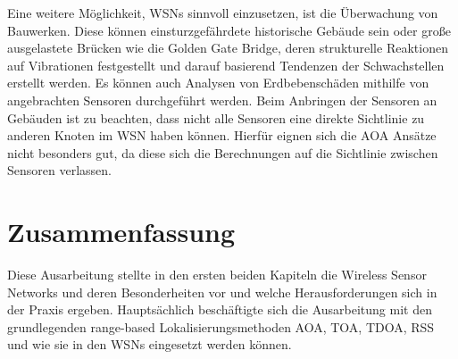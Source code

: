 \documentclass[12pt, a4wide]{scrreprt}
\begin{document}
Eine weitere Möglichkeit, WSNs sinnvoll einzusetzen, ist die Überwachung von Bauwerken. Diese können einsturzgefährdete historische Gebäude sein\cite{historical_monitoring} oder große ausgelastete Brücken wie die Golden Gate Bridge\cite{bridge_monitoring}, deren strukturelle Reaktionen auf Vibrationen festgestellt und darauf basierend Tendenzen der Schwachstellen erstellt werden. Es können auch Analysen von Erdbebenschäden mithilfe von angebrachten Sensoren durchgeführt werden. Beim Anbringen der Sensoren an Gebäuden ist zu beachten, dass nicht alle Sensoren eine direkte Sichtlinie zu anderen Knoten im WSN haben können. Hierfür eignen sich die AOA Ansätze nicht besonders gut, da diese sich die Berechnungen auf die Sichtlinie zwischen Sensoren verlassen.

\chapter{Zusammenfassung}
Diese Ausarbeitung stellte in den ersten beiden Kapiteln die Wireless Sensor Networks und deren Besonderheiten vor und welche Herausforderungen sich in der Praxis ergeben. Hauptsächlich beschäftigte sich die Ausarbeitung mit den grundlegenden range-based Lokalisierungsmethoden AOA, TOA, TDOA, RSS und wie sie in den WSNs eingesetzt werden können.
\newpage


\nocite{*}
\end{document}
